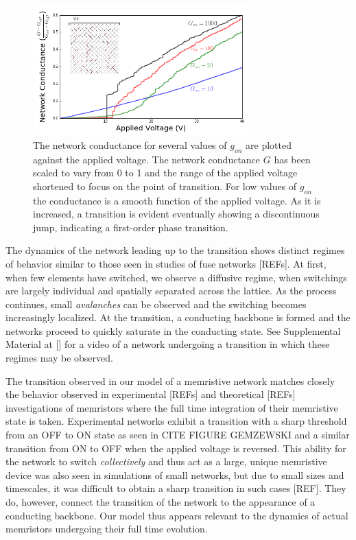 \documentclass[aps,prl,reprint,groupedaddress]{revtex4-1}
\begin{document}
\begin{figure}
\includegraphics[width=8.3cm]{PT_Networks_Conductances-2.png}
\caption{The network conductance for several values of $g_{on}$ are plotted
against the applied voltage.  The network conductance $G$ has been scaled to
vary from 0 to 1 and the range of the applied voltage shortened to focus on
the point of transition. For low values of $g_{on}$ the conductance is a
smooth function of the applied voltage.  As it is increased, a transition is
evident eventually showing a discontinuous jump, indicating a first-order 
phase transition.\label{Cond_fig}}
\end{figure}

The dynamics of the network leading up to the transition shows 
distinct regimes of behavior similar to those seen in studies of fuse
networks [REFs]. At first, when few elements have switched,
we observe a diffusive regime, when switchings are largely individual and
spatially separated across the lattice.  As the process continues,
small {\it avalanches} can be observed and the switching becomes increasingly
localized.  At the transition, a conducting backbone is formed and the
networks proceed to quickly saturate in the conducting state. See
Supplemental Material at [] for a video of a network undergoing a transition
in which these regimes may be observed. 

The transition observed in our model of a memristive network
matches closely the behavior observed  in experimental [REFs] and theoretical [REFs] investigations of
memristors where the full time integration of their memristive state is taken.  Experimental networks exhibit a transition with a sharp
threshold from an OFF to ON state as seen in CITE FIGURE GEMZEWSKI and a
similar transition from ON to OFF when the applied voltage is reversed.
This ability for the network to switch {\it collectively} and thus act as a large, unique 
memristive device was also seen in simulations of small networks, but due to
small sizes and timescales, it was difficult to obtain a sharp transition in such cases [REF].
They do, however, connect the transition of the network to the appearance of
a conducting backbone.  Our model thus appears relevant to the
dynamics of actual memristors undergoing their full time evolution. 
\end{document}
